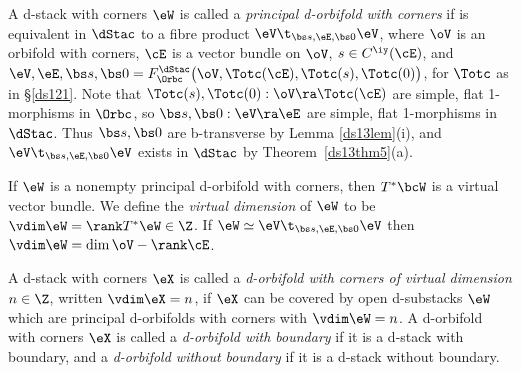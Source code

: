 \documentclass{article}
\begin{document}
\begin{dfn} A d-stack with corners $\eW$ is called a {\it principal
d-orbifold with corners\/} if is equivalent in
$\dStac$ to a fibre product $\eV\t_{\bs s,\eE,\bs 0}\eV$, where
$\oV$ is an orbifold with corners, $\cE$ is a vector bundle on
$\oV$, $s\in C^\iy(\cE)$, and $\eV,\eE,\bs s,\bs
0=F_\Orbc^\dStac\bigl(\oV,\Totc(\cE), \Totc(s),\Totc(0)\bigr)$, for
$\Totc$ as in \S\ref{ds121}. Note that
$\Totc(s),\Totc(0):\oV\ra\Totc(\cE)$ are simple, flat 1-morphisms in
$\Orbc$, so $\bs s,\bs 0:\eV\ra\eE$ are simple, flat 1-morphisms in
$\dStac$. Thus $\bs s,\bs 0$ are b-transverse by Lemma \ref{ds13lem}(i), and
$\eV\t_{\bs s,\eE,\bs 0}\eV$ exists in $\dStac$ by
Theorem~\ref{ds13thm5}(a).

If $\eW$ is a nonempty principal d-orbifold with corners, then
$T^*\bcW$ is a virtual vector bundle. We define the {\it virtual
dimension\/} of $\eW$ to be $\vdim\eW=\rank T^*\eW\in\Z$. If
$\eW\simeq\eV\t_{\bs s,\eE,\bs 0}\eV$
then~$\vdim\eW=\dim\oV-\rank\cE$.

A d-stack with corners $\eX$ is called a {\it d-orbifold with
corners of virtual dimension\/} $n\in\Z$, written $\vdim\eX=n$, if $\eX$ can be covered
by open d-substacks $\eW$ which are principal d-orbifolds with
corners with $\vdim\eW=n$. A d-orbifold with corners $\eX$ is called
a {\it d-orbifold with boundary\/} if it
is a d-stack with boundary, and a {\it d-orbifold without
boundary\/} if it is a d-stack without boundary.


\end{dfn}
\end{document}

